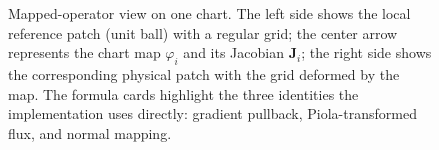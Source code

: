 \documentclass[sort&compress]{svjour3} %
\begin{document}
\begin{figure}[htbp]
\caption{Mapped-operator view on one chart. The left side shows the local reference patch (unit ball) with a regular grid; the center arrow represents the chart map $\varphi_i$ and its Jacobian $\mathbf{J}_i$; the right side shows the corresponding physical patch with the grid deformed by the map. The formula cards highlight the three identities the implementation uses directly: gradient pullback, Piola-transformed flux, and normal mapping.}
\label{fig:mapped_operator_schematic}
\end{figure}
\end{document}
